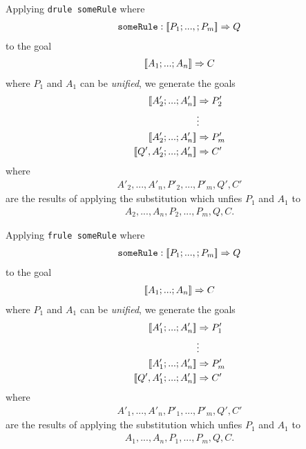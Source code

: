 \documentclass{article}
\begin{document}
\begin{definition}
    Applying \texttt{drule someRule} where
    \begin{align*}
        \texttt{someRule} : [\![P_1;...,;P_m]\!] \Rightarrow Q
    \end{align*}
    to the goal
    \begin{align*}
        [\![A_1; ...; A_n]\!] \Rightarrow C
    \end{align*}
    where $P_1$ and $A_1$ can be \emph{unified}, we generate the goals
    \begin{align*}
        \db{A'_2; ...; A'_n} &\Rightarrow P'_2\\
        &\vdots \\
        \db{A'_2; ...; A'_n} &\Rightarrow P'_m\\
        \db{Q',A'_2; ...; A'_n} &\Rightarrow C'
    \end{align*}
    where \begin{align*}
        A'_2, ..., A'_n,P'_2,...,P'_m,Q',C'
    \end{align*}
    are the results of applying the
    substitution which unfies $P_1$ and $A_1$ to
    \begin{align*}
        A_2,...,A_n,P_2,...,P_m,Q,C.
    \end{align*}
\end{definition}
\begin{definition}
    Applying \texttt{frule someRule} where
    \begin{align*}
        \texttt{someRule} : [\![P_1;...,;P_m]\!] \Rightarrow Q
    \end{align*}
    to the goal
    \begin{align*}
        [\![A_1; ...; A_n]\!] \Rightarrow C
    \end{align*}
    where $P_1$ and $A_1$ can be \emph{unified}, we generate the goals
    \begin{align*}
        \db{A'_1; ...; A'_n} &\Rightarrow P'_1\\
        &\vdots \\
        \db{A'_1; ...; A'_n} &\Rightarrow P'_m\\
        \db{Q',A'_1; ...; A'_n} &\Rightarrow C'
    \end{align*}
    where \begin{align*}
        A'_1, ..., A'_n,P'_1,...,P'_m,Q',C'
    \end{align*}
    are the results of applying the
    substitution which unfies $P_1$ and $A_1$ to
    \begin{align*}
        A_1,...,A_n,P_1,...,P_m,Q,C.
    \end{align*}
\end{definition}
\end{document}
